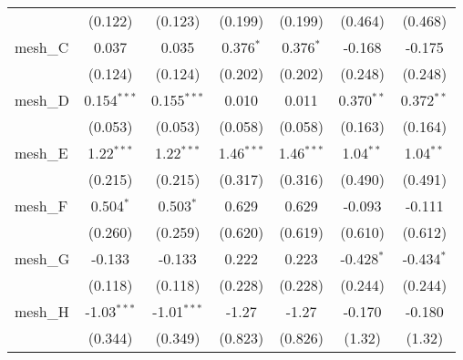 \begin{tabular}{lcccccc}
                                                               & (0.122)        & (0.123)        & (0.199)        & (0.199)        & (0.464)       & (0.468)\\   
   mesh\_C                                                     & 0.037          & 0.035          & 0.376$^{*}$    & 0.376$^{*}$    & -0.168        & -0.175\\   
                                                               & (0.124)        & (0.124)        & (0.202)        & (0.202)        & (0.248)       & (0.248)\\   
   mesh\_D                                                     & 0.154$^{***}$  & 0.155$^{***}$  & 0.010          & 0.011          & 0.370$^{**}$  & 0.372$^{**}$\\   
                                                               & (0.053)        & (0.053)        & (0.058)        & (0.058)        & (0.163)       & (0.164)\\   
   mesh\_E                                                     & 1.22$^{***}$   & 1.22$^{***}$   & 1.46$^{***}$   & 1.46$^{***}$   & 1.04$^{**}$   & 1.04$^{**}$\\   
                                                               & (0.215)        & (0.215)        & (0.317)        & (0.316)        & (0.490)       & (0.491)\\   
   mesh\_F                                                     & 0.504$^{*}$    & 0.503$^{*}$    & 0.629          & 0.629          & -0.093        & -0.111\\   
                                                               & (0.260)        & (0.259)        & (0.620)        & (0.619)        & (0.610)       & (0.612)\\   
   mesh\_G                                                     & -0.133         & -0.133         & 0.222          & 0.223          & -0.428$^{*}$  & -0.434$^{*}$\\   
                                                               & (0.118)        & (0.118)        & (0.228)        & (0.228)        & (0.244)       & (0.244)\\   
   mesh\_H                                                     & -1.03$^{***}$  & -1.01$^{***}$  & -1.27          & -1.27          & -0.170        & -0.180\\   
                                                               & (0.344)        & (0.349)        & (0.823)        & (0.826)        & (1.32)        & (1.32)\\   

\end{tabular}
